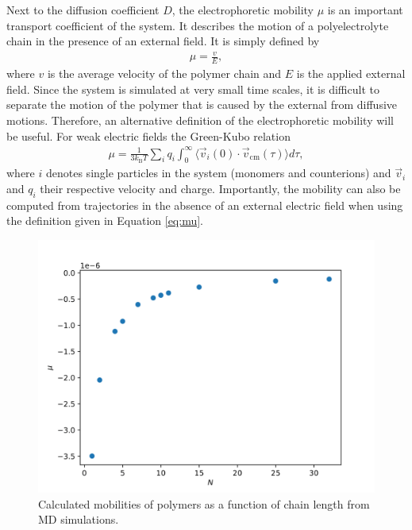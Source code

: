 
Next to the diffusion coefficient $D$, the electrophoretic mobility $\mu$ is an important transport coefficient of the system. It describes the motion of a polyelectrolyte chain in the presence of an external field. It is simply defined by
\begin{align}
	\mu = \frac{v}{E},
\end{align}
where $v$ is the average velocity of the polymer chain and $E$ is the applied external field. Since the system is simulated at very small time scales, it is difficult to separate the motion of the polymer that is caused by the external from diffusive motions. Therefore, an alternative definition of the electrophoretic mobility will be useful. For weak electric fields the Green-Kubo relation
\begin{align}
	\label{eq:mu}
	\mu = \frac{1}{3k_\text{B}T} \sum_{i} q_i \int_{0}^{\infty} \langle \vec{v}_i(0) \cdot \vec{v}_\text{cm}(\tau) \rangle d\tau,
\end{align}
where $i$ denotes single particles in the system (monomers and counterions) and $\vec{v}_i$ and $q_i$ their respective velocity and charge. Importantly, the mobility can also be computed from trajectories in the absence of an external electric field when using the definition given in Equation \eqref{eq:mu}.
\begin{figure}[H]
	\includegraphics[width=\columnwidth]{Analysis_1/test_mobilities}
	\captionsetup{width=\columnwidth}
	\caption{Calculated mobilities of polymers as a function of chain length from MD simulations.}
	\label{fig:mobilities}
\end{figure}
